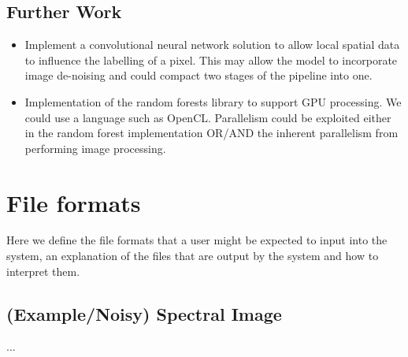\documentclass[12pt,twoside,notitlepage]{report}
\begin{document}
    \section{Further Work}
        \begin{itemize}
            \item Implement a convolutional neural network solution to allow local spatial data to influence the labelling of a pixel. This may allow the model to incorporate image de-noising and could compact two stages of the pipeline into one.
            \item Implementation of the random forests library to support GPU processing. We could use a language such as OpenCL. Parallelism could be exploited either in the random forest implementation OR/AND the inherent parallelism from performing image processing.
        \end{itemize}











\cleardoublepage
{}

\cleardoublepage










\appendix


\cleardoublepage
\chapter{File formats}    \label{app:file_formats}
    Here we define the file formats that a user might be expected to input into the system, an explanation of the 
    files that are output by the system and how to interpret them.

    \section{(Example/Noisy) Spectral Image}
        ...
\end{document}
